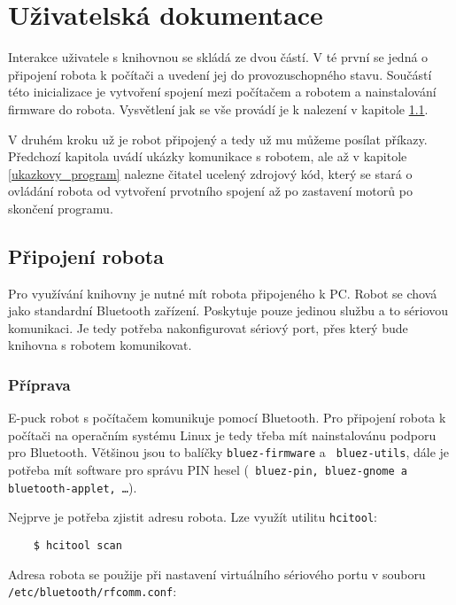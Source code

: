 \chapter{Uživatelská dokumentace}
\label{dokumentace}

    Interakce uživatele s knihovnou se skládá ze dvou částí. V té první se
    jedná o připojení robota k počítači a uvedení jej do provozuschopného
    stavu. Součástí této inicializace je vytvoření spojení mezi počítačem a
    robotem a nainstalování firmware do robota. Vysvětlení jak se vše provádí
    je k nalezení v kapitole \ref{pripojeni_robota}.

    V druhém kroku už je robot připojený a tedy už mu můžeme posílat příkazy.
    Předchozí kapitola uvádí ukázky komunikace s robotem, ale až v kapitole
    \ref{ukazkovy_program} nalezne čitatel ucelený zdrojový kód, který se stará
    o ovládání robota od vytvoření prvotního spojení až po zastavení motorů po
    skončení programu.

    \section{Připojení robota}
    \label{pripojeni_robota}

    Pro využívání knihovny je nutné mít robota připojeného k PC. Robot se chová
    jako standardní Bluetooth zařízení. Poskytuje pouze jedinou službu a to
    sériovou komunikaci. Je tedy potřeba nakonfigurovat sériový port, přes
    který bude knihovna s robotem komunikovat.

    \subsection{Příprava}

    E-puck robot s počítačem komunikuje pomocí Bluetooth. Pro připojení robota
    k počítači na operačním systému Linux je tedy třeba mít nainstalovánu
    podporu pro Bluetooth. Většinou jsou to balíčky {\tt bluez-firmware} a {\tt
    bluez-utils}, dále je potřeba mít software pro správu PIN hesel ({\tt
    bluez-pin, bluez-gnome a bluetooth-applet, \ldots}).

    Nejprve je potřeba zjistit adresu robota. Lze využít utilitu {\tt hcitool}:

    \begin{verbatim}
    $ hcitool scan
    \end{verbatim}

    Adresa robota se použije při nastavení virtuálního sériového portu v
    souboru {\tt /etc/bluetooth/rfcomm.conf}:


